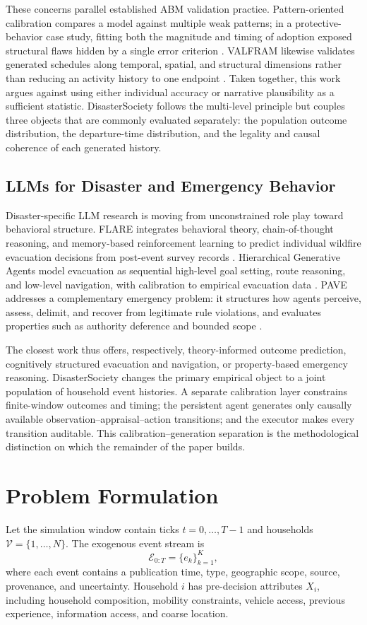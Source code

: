 \documentclass[journal]{IEEEtran}
\newcommand{\method}{DisasterSociety}
\begin{document}
These concerns parallel established ABM validation practice. Pattern-oriented
calibration compares a model against multiple weak patterns; in a
protective-behavior case study, fitting both the magnitude and timing of
adoption exposed structural flaws hidden by a single error criterion
\cite{badham2017calibrating}. VALFRAM likewise validates generated schedules
along temporal, spatial, and structural dimensions rather than reducing an
activity history to one endpoint \cite{drchal2016valfram}. Taken together,
this work argues against using either individual accuracy or narrative
plausibility as a sufficient statistic. \method{} follows the multi-level
principle but couples three objects that are commonly evaluated separately:
the population outcome distribution, the departure-time distribution, and
the legality and causal coherence of each generated history.

\subsection{LLMs for Disaster and Emergency Behavior}
Disaster-specific LLM research is moving from unconstrained role play toward
behavioral structure. FLARE integrates behavioral theory, chain-of-thought
reasoning, and memory-based reinforcement learning to predict individual
wildfire evacuation decisions from post-event survey records
\cite{chen2025flare}. Hierarchical Generative Agents model evacuation as
sequential high-level goal setting, route reasoning, and low-level navigation,
with calibration to empirical evacuation data
\cite{mendoza2026hierarchical}. PAVE addresses a complementary emergency
problem: it structures how agents perceive, assess, delimit, and recover from
legitimate rule violations, and evaluates properties such as authority
deference and bounded scope \cite{yehia2026pave}.

The closest work thus offers, respectively, theory-informed outcome
prediction, cognitively structured evacuation and navigation, or
property-based emergency reasoning. \method{} changes the primary empirical
object to a joint population of household event histories. A separate
calibration layer constrains finite-window outcomes and timing; the persistent
agent generates only causally available observation--appraisal--action
transitions; and the executor makes every transition auditable. This
calibration--generation separation is the methodological distinction on which
the remainder of the paper builds.

\section{Problem Formulation}
\label{sec:problem}
Let the simulation window contain ticks $t=0,\ldots,T-1$ and households
$\mathcal{V}=\{1,\ldots,N\}$. The exogenous event stream is
\begin{equation}
\mathcal{E}_{0:T}=\{e_k\}_{k=1}^{K},
\end{equation}
where each event contains a publication time, type, geographic scope, source,
provenance, and uncertainty. Household $i$ has pre-decision attributes $X_i$,
including household composition, mobility constraints, vehicle access,
previous experience, information access, and coarse location.
\end{document}
